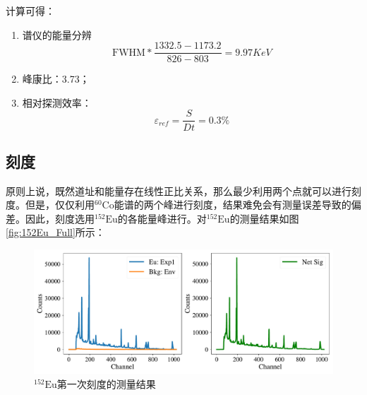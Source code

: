 \documentclass{article}
\begin{document}
计算可得：
\begin{enumerate}
    \item 谱仪的能量分辨
    \begin{equation}
        \text{FWHM}*\frac{1332.5-1173.2}{826-803} = 9.97\si{KeV}
    \end{equation}
\item 峰康比：3.73；
\item 相对探测效率：
\begin{equation}
    \varepsilon_{ref} = \frac{S}{Dt} = 0.3\%
\end{equation}
\end{enumerate}
\subsection{刻度}
原则上说，既然道址和能量存在线性正比关系，那么最少利用两个点就可以进行刻度。但是，仅仅利用$^{60}\text{Co}$能谱的两个峰进行刻度，结果难免会有测量误差导致的偏差。因此，刻度选用$^{152}\text{Eu}$的各能量峰进行。对$^{152}\text{Eu}$的测量结果如图\ref{fig:152Eu_Full}所示：
\begin{figure}[htbp]
    \centering
    \includegraphics[width=\textwidth]{../plots/Eu_full_net.pdf}
    \caption{$^{152}\text{Eu}$第一次刻度的测量结果\label{fig:152_Eu_Full}}
\end{figure}
\end{document}
